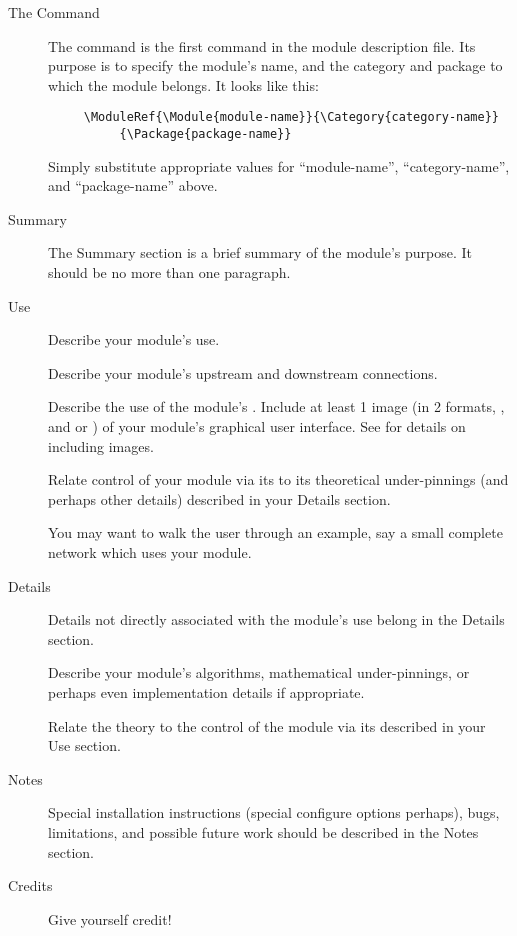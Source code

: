 \documentclass[11pt]{article}
\begin{document}
\begin{description}
\item[The  Command]\mbox{}
  The  command is the first command in the
  module description file.  Its purpose is to specify the module's
  name, and the category and package to which the module belongs.  It
  looks like this:

\begin{verbatim}
     \ModuleRef{\Module{module-name}}{\Category{category-name}}
          {\Package{package-name}}
\end{verbatim}
  
  Simply substitute appropriate values for ``module-name'',
  ``category-name'', and ``package-name'' above.

\item[Summary]
  \label{sec:summary} \mbox{}
  The Summary section is a brief summary of the module's purpose.  It
  should be no more than one paragraph.

\item[Use] \label{sec:use} \mbox{}
  
  
  Describe your module's use.  
  
  Describe your module's upstream and downstream connections.
  
  Describe the use of the module's \gui{}.  Include at least 1 image
  (in 2 formats, , and  or )
  of your module's graphical user interface.  See  for details on including images.
  
  Relate control of your module via its \gui{} to its theoretical
  under-pinnings (and perhaps other details) described in your
  Details section.
  
  You may want to walk the user through an example, say a small
  complete network which uses your module.

\item[Details] \mbox{}
  \label{sec:details}
  
  Details not directly associated with the module's use belong in
  the Details section.
  
  Describe your module's algorithms, mathematical under-pinnings, or
  perhaps even implementation details if appropriate.
  
  Relate the theory to the control of the module via its \gui{}
  described in your Use section.

\item[Notes]\mbox{}
  \label{sec:notes}
  
  Special installation instructions (special configure options
  perhaps), bugs, limitations, and possible future work should be
  described in the Notes section.

\item[Credits]
  \label{sec:credits}
  
  Give yourself credit!
\end{description}
\end{document}

